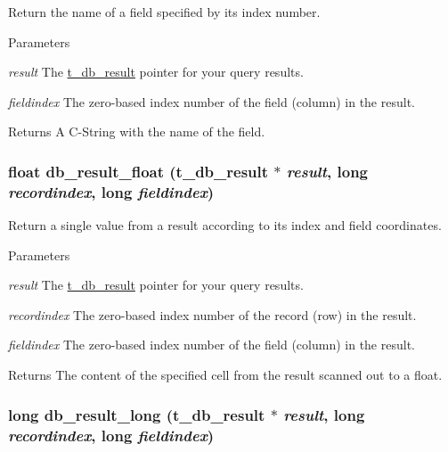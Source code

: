 Return the name of a field specified by its index number. 
\begin{DoxyParams}{Parameters}
\item[{\em result}]The \hyperlink{group__database_gae34db00cb98960e94b5ca58a7c21c362}{t\_\-db\_\-result} pointer for your query results. \item[{\em fieldindex}]The zero-\/based index number of the field (column) in the result. \end{DoxyParams}
\begin{DoxyReturn}{Returns}
A C-\/String with the name of the field. 
\end{DoxyReturn}
\hypertarget{group__database_ga0558fcd917d24cc590ec0f426bf6bd7a}{
\subsubsection[{db\_\-result\_\-float}]{\setlength{\rightskip}{0pt plus 5cm}float db\_\-result\_\-float ({\bf t\_\-db\_\-result} $\ast$ {\em result}, \/  long {\em recordindex}, \/  long {\em fieldindex})}}
\label{group__database_ga0558fcd917d24cc590ec0f426bf6bd7a}


Return a single value from a result according to its index and field coordinates. 
\begin{DoxyParams}{Parameters}
\item[{\em result}]The \hyperlink{group__database_gae34db00cb98960e94b5ca58a7c21c362}{t\_\-db\_\-result} pointer for your query results. \item[{\em recordindex}]The zero-\/based index number of the record (row) in the result. \item[{\em fieldindex}]The zero-\/based index number of the field (column) in the result. \end{DoxyParams}
\begin{DoxyReturn}{Returns}
The content of the specified cell from the result scanned out to a float. 
\end{DoxyReturn}
\hypertarget{group__database_gadd498a9d44bc669bd544c781c1401e81}{
\subsubsection[{db\_\-result\_\-long}]{\setlength{\rightskip}{0pt plus 5cm}long db\_\-result\_\-long ({\bf t\_\-db\_\-result} $\ast$ {\em result}, \/  long {\em recordindex}, \/  long {\em fieldindex})}}
\label{group__database_gadd498a9d44bc669bd544c781c1401e81}


